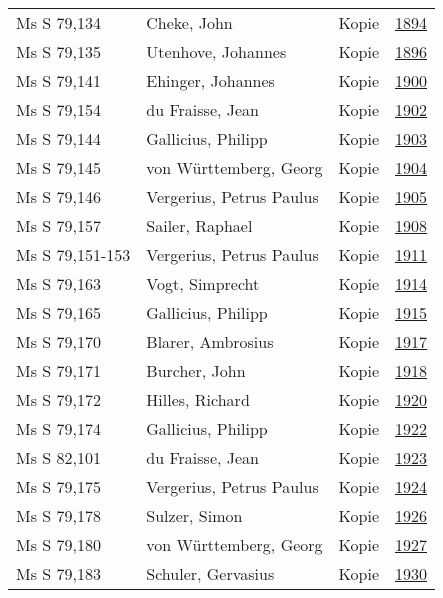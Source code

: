 \documentclass[10pt,a4paper,landscape]{report}
\begin{document}
\begin{longtable}{p{16cm}p{4cm}lr}
Ms S 79,134	&	Cheke, John	&	Kopie	&	\href{http://130.60.24.72/assignment/1894}{1894}\\
Ms S 79,135	&	Utenhove, Johannes	&	Kopie	&	\href{http://130.60.24.72/assignment/1896}{1896}\\
Ms S 79,141	&	Ehinger, Johannes	&	Kopie	&	\href{http://130.60.24.72/assignment/1900}{1900}\\
Ms S 79,154	&	du Fraisse, Jean	&	Kopie	&	\href{http://130.60.24.72/assignment/1902}{1902}\\
Ms S 79,144	&	Gallicius, Philipp	&	Kopie	&	\href{http://130.60.24.72/assignment/1903}{1903}\\
Ms S 79,145	&	von Württemberg, Georg	&	Kopie	&	\href{http://130.60.24.72/assignment/1904}{1904}\\
Ms S 79,146	&	Vergerius, Petrus Paulus	&	Kopie	&	\href{http://130.60.24.72/assignment/1905}{1905}\\
Ms S 79,157	&	Sailer, Raphael	&	Kopie	&	\href{http://130.60.24.72/assignment/1908}{1908}\\
Ms S 79,151-153	&	Vergerius, Petrus Paulus	&	Kopie	&	\href{http://130.60.24.72/assignment/1911}{1911}\\
Ms S 79,163	&	Vogt, Simprecht	&	Kopie	&	\href{http://130.60.24.72/assignment/1914}{1914}\\
Ms S 79,165	&	Gallicius, Philipp	&	Kopie	&	\href{http://130.60.24.72/assignment/1915}{1915}\\
Ms S 79,170	&	Blarer, Ambrosius	&	Kopie	&	\href{http://130.60.24.72/assignment/1917}{1917}\\
Ms S 79,171	&	Burcher, John	&	Kopie	&	\href{http://130.60.24.72/assignment/1918}{1918}\\
Ms S 79,172	&	Hilles, Richard	&	Kopie	&	\href{http://130.60.24.72/assignment/1920}{1920}\\
Ms S 79,174	&	Gallicius, Philipp	&	Kopie	&	\href{http://130.60.24.72/assignment/1922}{1922}\\
Ms S 82,101	&	du Fraisse, Jean	&	Kopie	&	\href{http://130.60.24.72/assignment/1923}{1923}\\
Ms S 79,175	&	Vergerius, Petrus Paulus	&	Kopie	&	\href{http://130.60.24.72/assignment/1924}{1924}\\
Ms S 79,178	&	Sulzer, Simon	&	Kopie	&	\href{http://130.60.24.72/assignment/1926}{1926}\\
Ms S 79,180	&	von Württemberg, Georg	&	Kopie	&	\href{http://130.60.24.72/assignment/1927}{1927}\\
Ms S 79,183	&	Schuler, Gervasius	&	Kopie	&	\href{http://130.60.24.72/assignment/1930}{1930}\\

\end{longtable}
\end{document}
